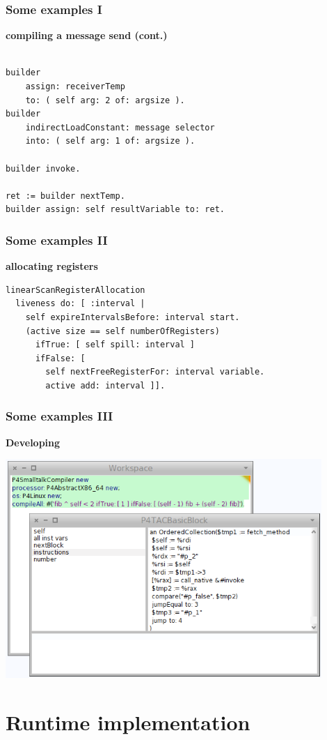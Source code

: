 \documentclass{beamer}
\begin{document}
\begin{frame}[fragile]
    \frametitle{Some examples I}
    {\bf compiling a message send (cont.)}
    \begin{lstlisting}
    
builder 
    assign: receiverTemp 
    to: ( self arg: 2 of: argsize ).
builder 
    indirectLoadConstant: message selector 
    into: ( self arg: 1 of: argsize ).
        
builder invoke.

ret := builder nextTemp.
builder assign: self resultVariable to: ret.

    \end{lstlisting}
\end{frame}

\begin{frame}[fragile]
    \frametitle{Some examples II}
    {\bf allocating registers}
    \begin{lstlisting}
linearScanRegisterAllocation
  liveness do: [ :interval |
    self expireIntervalsBefore: interval start.
    (active size == self numberOfRegisters)
      ifTrue: [ self spill: interval ]
      ifFalse: [ 
        self nextFreeRegisterFor: interval variable.  
        active add: interval ]].
    \end{lstlisting}
\end{frame}

\begin{frame}[fragile]
    \frametitle{Some examples III}
    {\bf Developing}
    \begin{center}\includegraphics[width=0.9\textwidth]{developing.png}\end{center}
\end{frame}

\section{Runtime implementation}
\end{document}
